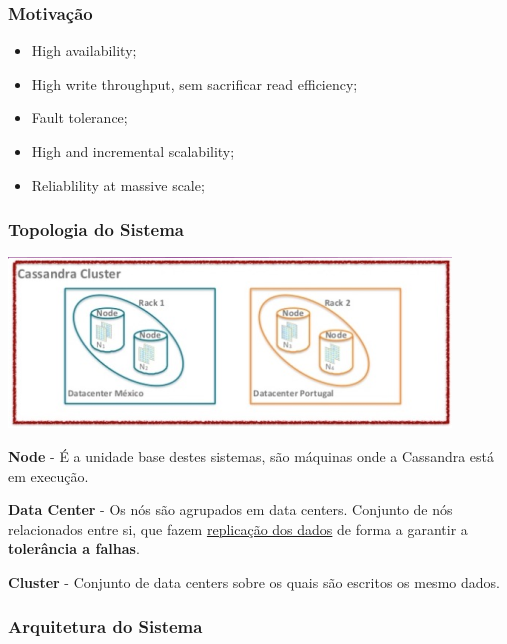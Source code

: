 \documentclass{article}
\begin{document}
\subsubsection{Motivação}
\begin{itemize}
  \item High availability;
  \item High write throughput, sem sacrificar read efficiency;
  \item Fault tolerance;
  \item High and incremental scalability;
  \item Reliablility at massive scale;
\end{itemize}

\subsubsection{Topologia do Sistema}

\begin{center}
  \includegraphics[scale=0.3]{13}
\end{center}

\begin{flushleft}
  \textbf{Node} - É a unidade base destes sistemas, são máquinas
  onde a Cassandra está em execução.

  \vspace{2mm}

  \textbf{Data Center} - Os nós são agrupados em data centers.
  Conjunto de nós relacionados entre si, que fazem \uline{replicação dos dados}
  de forma a garantir a \textbf{tolerância a falhas}.

  \vspace{2mm}

  \textbf{Cluster} - Conjunto de data centers sobre os quais são escritos
  os mesmo dados.
\end{flushleft}

\pagebreak

\subsubsection{Arquitetura do Sistema}
\end{document}

